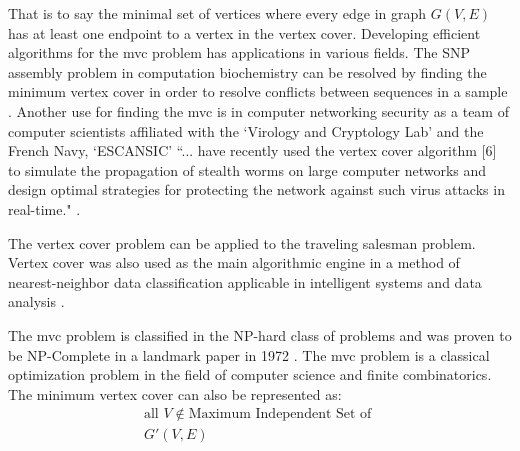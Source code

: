 \documentclass[conference,letterpaper]{IEEEtran}
\begin{document}
\par That is to say the minimal set of vertices where every edge in graph $G(V,E)$ has at least one endpoint to a vertex in the vertex cover. Developing efficient algorithms for the mvc problem has applications in various fields. The SNP assembly problem in computation biochemistry can be resolved by finding the minimum vertex cover in order to resolve conflicts between sequences in a sample \cite{pirzada}. Another use for finding the mvc is in computer networking security as a team of computer scientists affiliated with the `Virology and Cryptology Lab' and the French Navy, `ESCANSIC' ``... have recently used the vertex cover algorithm [6] to simulate the propagation of stealth worms on large computer networks and design optimal strategies for protecting the network against such virus attacks in real-time." \cite{pirzada}. 
\par The vertex cover problem can be applied to the traveling salesman problem. Vertex cover was also used as the main algorithmic engine in a method of nearest-neighbor data classification applicable in intelligent systems and data analysis \cite{gkk}.

\par The mvc problem is classified in the NP-hard class of problems and was proven to be NP-Complete in a landmark paper in 1972 \cite{kar72}. The mvc problem is a classical optimization problem in the field of computer science and finite combinatorics. The minimum vertex cover can also be represented as:
\begin{equation}
    \begin{split}
        \mbox{all } V \notin \mbox{Maximum Independent Set of } \\ 
        G'(V, E)
    \end{split}
\end{equation}
\end{document}
